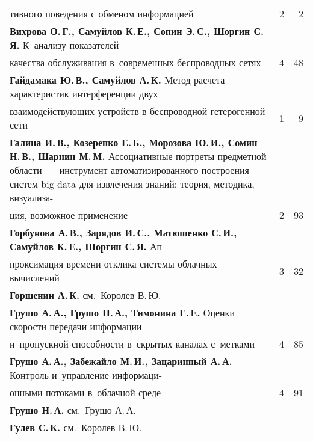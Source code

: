 {\begin{tabular}{p{388pt}rr}
\\[-12pt]
\hspace*{21pt}тивного поведения с обменом информацией&2&2\\
\textbf{Вихрова О.\,Г., Самуйлов К.\,Е., Сопин Э.\,С., Шоргин С.\,Я.}
К~анализу показателей\linebreak
\\[-12pt]
\hspace*{21pt}качества обслуживания в~современных беспроводных
сетях&4&48\\
\textbf{Гайдамака Ю.\,В., Самуйлов А.\,К.} Метод расчета характеристик
интерференции двух\linebreak
\\[-12pt]
\hspace*{21pt}взаимодействующих устройств в беспроводной
гетерогенной сети&1&9\\
\hangindent=21pt\noindent\textbf{Галина И.\,В., Козеренко Е.\,Б., Морозова Ю.\,И., Сомин Н.\,В.,
Шарнин М.\,М.} Ассоциативные портреты предметной области~--- инструмент
автоматизированного построения сис\-тем big data для извлечения знаний:
теория, методика, визуализа-\linebreak
\\[-12pt]
\hspace*{21pt}ция, возможное применение&2&93\\
\textbf{Горбунова А.\,В., Зарядов И.\,С., Матюшенко С.\,И., Самуйлов
К.\,Е., Шоргин С.\,Я.} Ап-\linebreak
\\[-12pt]
\hspace*{21pt}проксимация времени отклика сис\-те\-мы облачных
вычислений&3& 32\\
\textbf{Горшенин А.\,К.} см.\ Королев В.\,Ю.&&\\
\textbf{Грушо А.\,А., Грушо Н.\,А., Тимонина Е.\,Е.} Оценки скорости
передачи информации\linebreak
\\[-12pt]
\hspace*{21pt}и~пропускной способности в~скрытых каналах
с~метками&4&85\\
\textbf{Грушо А.\,А., Забежайло М.\,И., Зацаринный А.\,А.} Контроль
и~управление информаци-\linebreak
\\[-12pt]
\hspace*{21pt}онными потоками в~облачной среде&4&91\\
\textbf{Грушо Н.\,А.} см.\ Грушо А.\,А.&&\\
\textbf{Гулев С.\,К.} см.\ Королев В.\,Ю.&&\\

\end{tabular}}

